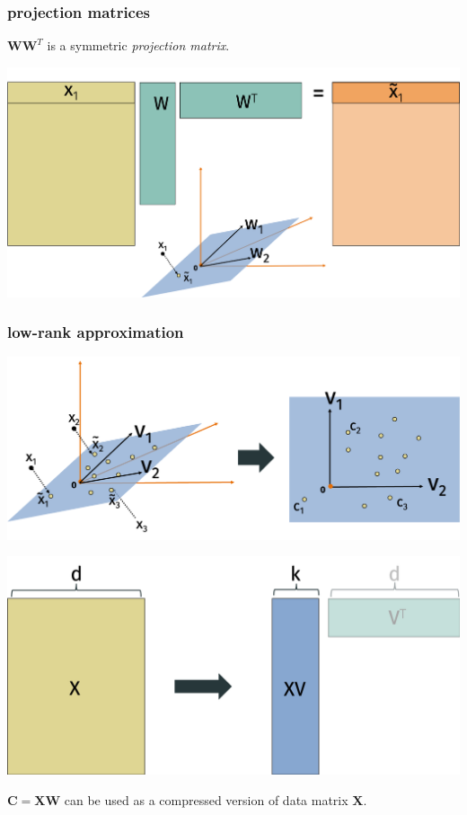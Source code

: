 \documentclass[compress]{beamer}
\newcommand{\bv}[1]{\mathbf{#1}}
\begin{document}
\begin{frame}
	\frametitle{projection matrices}
	$\bv{W}\bv{W}^T$ is a symmetric \emph{projection matrix}.
	\begin{center}
		\includegraphics[width=\textwidth]{projection.png}
	\end{center}
\end{frame}

\begin{frame}
	\frametitle{low-rank approximation}
	\vspace{-1em}
	\begin{center}
		\includegraphics[width=.8\textwidth]{project_full.png}
	\end{center}
	\begin{center}
		\includegraphics[width=.5\textwidth]{lowrankcompress.png}
	\end{center}
	$\bv{C} = \bv{XW}$ can be used as a compressed version of data matrix $\bv{X}$. 
\end{frame}
\end{document}
